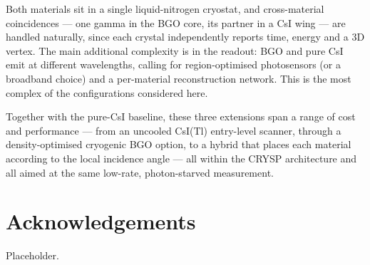 \documentclass{iopjournal}
\begin{document}
Both materials sit in a single liquid-nitrogen cryostat, and cross-material
coincidences --- one gamma in the BGO core, its partner in a CsI wing --- are
handled naturally, since each crystal independently reports time, energy and a
3D vertex. The main additional complexity is in the readout: BGO and pure CsI
emit at different wavelengths, calling for region-optimised photosensors (or a
broadband choice) and a per-material reconstruction network. This is the most
complex of the configurations considered here.

\medskip
Together with the pure-CsI baseline, these three extensions span a range of
cost and performance --- from an uncooled CsI(Tl) entry-level scanner, through a
density-optimised cryogenic BGO option, to a hybrid that places each material
according to the local incidence angle --- all within the CRYSP architecture and
all aimed at the same low-rate, photon-starved measurement.

\section*{Acknowledgements}
Placeholder.



\end{document}
